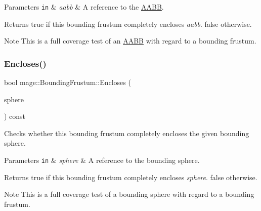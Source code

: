\begin{DoxyParams}[1]{Parameters}
\mbox{\tt in}  & {\em aabb} & A reference to the \hyperlink{classmage_1_1_a_a_b_b}{A\+A\+BB}. \\
\hline
\end{DoxyParams}
\begin{DoxyReturn}{Returns}
{\ttfamily true} if this bounding frustum completely encloses {\itshape aabb}. {\ttfamily false} otherwise. 
\end{DoxyReturn}
\begin{DoxyNote}{Note}
This is a full coverage test of an \hyperlink{classmage_1_1_a_a_b_b}{A\+A\+BB} with regard to a bounding frustum. 
\end{DoxyNote}
\hypertarget{classmage_1_1_bounding_frustum_a64bb28f632ae39438424a714809c31de}{}\label{classmage_1_1_bounding_frustum_a64bb28f632ae39438424a714809c31de} 
\subsubsection{\texorpdfstring{Encloses()}{Encloses()}\hspace{0.1cm}{\footnotesize\ttfamily [4/4]}}
{\footnotesize\ttfamily bool mage\+::\+Bounding\+Frustum\+::\+Encloses (\begin{DoxyParamCaption}\item[{const \hyperlink{classmage_1_1_bounding_sphere}{Bounding\+Sphere} \&}]{sphere }\end{DoxyParamCaption}) const\hspace{0.3cm}{\ttfamily [noexcept]}}

Checks whether this bounding frustum completely encloses the given bounding sphere.


\begin{DoxyParams}[1]{Parameters}
\mbox{\tt in}  & {\em sphere} & A reference to the bounding sphere. \\
\hline
\end{DoxyParams}
\begin{DoxyReturn}{Returns}
{\ttfamily true} if this bounding frustum completely encloses {\itshape sphere}. {\ttfamily false} otherwise. 
\end{DoxyReturn}
\begin{DoxyNote}{Note}
This is a full coverage test of a bounding sphere with regard to a bounding frustum. 
\end{DoxyNote}
\hypertarget{classmage_1_1_bounding_frustum_aeae9c1be8cebf662ccd6615145724dec}{}\label{classmage_1_1_bounding_frustum_aeae9c1be8cebf662ccd6615145724dec} 
